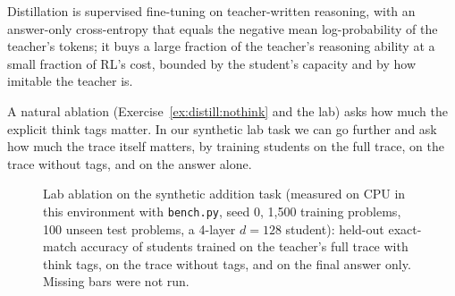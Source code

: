 \begin{keyidea}
Distillation is supervised fine-tuning on teacher-written reasoning, with an answer-only
cross-entropy that equals the negative mean log-probability of the teacher's tokens; it buys
a large fraction of the teacher's reasoning ability at a small fraction of RL's cost, bounded by
the student's capacity and by how imitable the teacher is.
\end{keyidea}

A natural ablation (Exercise~\ref{ex:distill:nothink} and the lab) asks how much the explicit
think tags matter. In our synthetic lab task we can go further and ask how much the trace
itself matters, by training students on the full trace, on the trace without tags, and on the
answer alone.

\begin{figure}[t]
\centering
{}
\caption{Lab ablation on the synthetic addition task (measured on CPU in this environment with
\texttt{bench.py}, seed 0, 1{,}500 training problems, 100 unseen test problems, a 4-layer
$d=128$ student): held-out exact-match accuracy of students trained on the teacher's full trace
with think tags, on the trace without tags, and on the final answer only. Missing bars were not
run.}
\label{fig:distill:labresult}
\end{figure}

